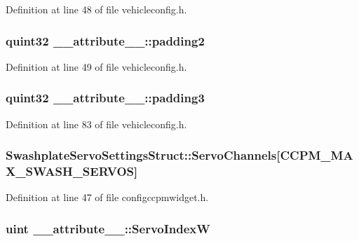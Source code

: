 Definition at line 48 of file vehicleconfig.\-h.

\hypertarget{group___config_plugin_ga445d386b31eb43aafbd971345a5b221e}{
\subsubsection[{padding2}]{\setlength{\rightskip}{0pt plus 5cm}quint32 \-\_\-\-\_\-attribute\-\_\-\-\_\-\-::padding2}}\label{group___config_plugin_ga445d386b31eb43aafbd971345a5b221e}


Definition at line 49 of file vehicleconfig.\-h.

\hypertarget{group___config_plugin_gae95d6e80e1c87598f33d4be1b0a8c410}{
\subsubsection[{padding3}]{\setlength{\rightskip}{0pt plus 5cm}quint32 \-\_\-\-\_\-attribute\-\_\-\-\_\-\-::padding3}}\label{group___config_plugin_gae95d6e80e1c87598f33d4be1b0a8c410}


Definition at line 83 of file vehicleconfig.\-h.

\hypertarget{group___config_plugin_ga86e55bfb2e22af5cf453931b3990d504}{
\subsubsection[{Servo\-Channels}]{ Swashplate\-Servo\-Settings\-Struct\-::\-Servo\-Channels\mbox{[}C\-C\-P\-M\-\_\-\-M\-A\-X\-\_\-\-S\-W\-A\-S\-H\-\_\-\-S\-E\-R\-V\-O\-S\mbox{]}}}\label{group___config_plugin_ga86e55bfb2e22af5cf453931b3990d504}


Definition at line 47 of file configccpmwidget.\-h.

\hypertarget{group___config_plugin_gaffe6aa75cde814b5068ce3494b2abb34}{
\subsubsection[{Servo\-Index\-W}]{\setlength{\rightskip}{0pt plus 5cm}uint \-\_\-\-\_\-attribute\-\_\-\-\_\-\-::\-Servo\-Index\-W}}\label{group___config_plugin_gaffe6aa75cde814b5068ce3494b2abb34}


